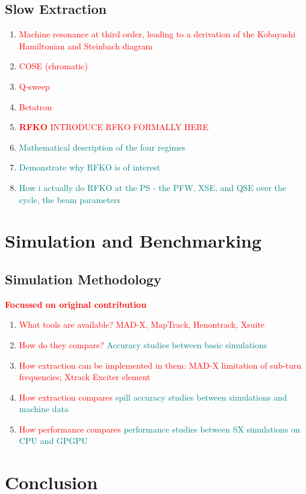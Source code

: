 \documentclass[11pt]{report}
\newcommand\todo[1]{\textcolor{red}{#1}}
\begin{document}
\section{Slow Extraction}

\begin{enumerate}
  \item \todo{Machine resonance at third order, leading to a derivation of the Kobayashi Hamiltonian and Steinbach diagram}
  \item \todo{COSE (chromatic)}
  \item \todo{Q-sweep}
  \item \todo{Betatron}
  \item \todo{\textbf{RFKO} INTRODUCE RFKO FORMALLY HERE}
  \item \textcolor{teal}{Mathematical description of the four regimes}
  
  \item \textcolor{teal}{Demonstrate why RFKO is of interest}
  \item \textcolor{teal}{How i actually do RFKO at the PS - the PFW, XSE, and QSE over the cycle, the beam parameters}
\end{enumerate}


\chapter{Simulation and Benchmarking}
\section{Simulation Methodology}
\todo{\textbf{Focussed on original contribution}}
\begin{enumerate}
    \item \todo{What tools are available? MAD-X, MapTrack, Henontrack, Xsuite}
    \item \todo{How do they compare?} \textcolor{teal}{Accuracy studies between basic simulations}
    \item \todo{How extraction can be implemented in them: MAD-X limitation of sub-turn frequencies; Xtrack Exciter element}
    \item \todo{How extraction compares} \textcolor{teal}{spill accuracy studies between simulations and machine data}
    \item \todo{How performance compares} \textcolor{teal}{performance studies between SX simulations on CPU and GPGPU}
\end{enumerate}

\chapter{Conclusion}
\end{document}
